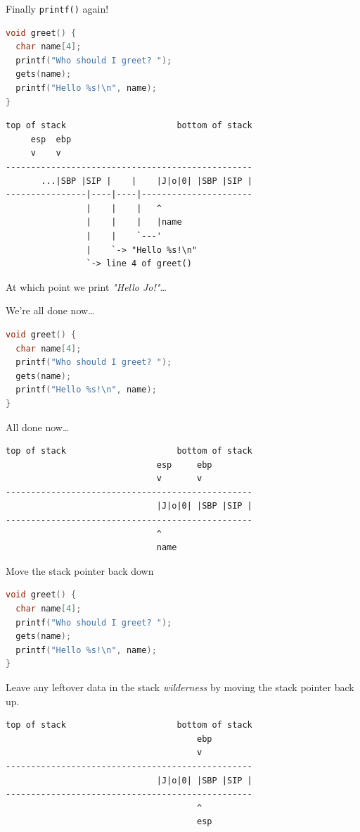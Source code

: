 \documentclass[9pt,aspectratio=169]{beamer}
\begin{document}
\begin{frame}[label={sec:org54fa8a9},fragile]{Finally \texttt{printf()} again!}
 \begin{lstlisting}[language=C,numbers=none]
void greet() {
  char name[4];
  printf("Who should I greet? ");
  gets(name);
  printf("Hello %s!\n", name);
}
\end{lstlisting}

\begin{verbatim}
top of stack                      bottom of stack
     esp  ebp
     v    v
-------------------------------------------------
       ...|SBP |SIP |    |    |J|o|0| |SBP |SIP |
----------------|----|----|----------------------
                |    |    |   ^
                |    |    |   |name
                |    |    `---'
                |    `-> "Hello %s!\n"    
                `-> line 4 of greet()
\end{verbatim}

At which point we print \emph{"Hello Jo!"}\ldots{}
\end{frame}
\begin{frame}[label={sec:orge9e6721},fragile]{We're all done now\ldots{}}
 \begin{lstlisting}[language=C,numbers=none]
void greet() {
  char name[4];
  printf("Who should I greet? ");
  gets(name);
  printf("Hello %s!\n", name);
}
\end{lstlisting}

All done now\ldots{}

\begin{verbatim}
top of stack                      bottom of stack
                              esp     ebp
                              v       v
-------------------------------------------------
                              |J|o|0| |SBP |SIP |
-------------------------------------------------
                              ^
                              name
\end{verbatim}
\end{frame}
\begin{frame}[label={sec:orgdc487d4},fragile]{Move the stack pointer back down}
 \begin{lstlisting}[language=C,numbers=none]
void greet() {
  char name[4];
  printf("Who should I greet? ");
  gets(name);
  printf("Hello %s!\n", name);
}
\end{lstlisting}

Leave any leftover data in the stack \emph{wilderness} by moving the stack pointer back up.

\begin{verbatim}
top of stack                      bottom of stack
                                      ebp
                                      v
-------------------------------------------------
                              |J|o|0| |SBP |SIP |
-------------------------------------------------
                                      ^
                                      esp
\end{verbatim}
\end{frame}
\end{document}
